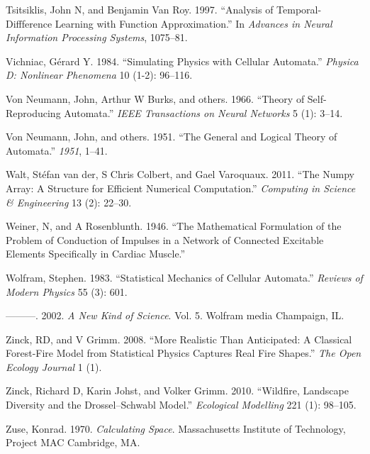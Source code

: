 \documentclass[
  openany]{book}
\newlength{\cslhangindent}
\newenvironment{cslreferences}%
  {\setlength{\parindent}{0pt}%
  \everypar{\setlength{\hangindent}{\cslhangindent}}\ignorespaces}%
  {\par}
\begin{document}
\begin{cslreferences}
\leavevmode\hypertarget{ref-tsitsiklis1997analysis}{}%
Tsitsiklis, John N, and Benjamin Van Roy. 1997. ``Analysis of Temporal-Diffference Learning with Function Approximation.'' In \emph{Advances in Neural Information Processing Systems}, 1075--81.

\leavevmode\hypertarget{ref-vichniac1984simulating}{}%
Vichniac, Gérard Y. 1984. ``Simulating Physics with Cellular Automata.'' \emph{Physica D: Nonlinear Phenomena} 10 (1-2): 96--116.

\leavevmode\hypertarget{ref-von1966theory}{}%
Von Neumann, John, Arthur W Burks, and others. 1966. ``Theory of Self-Reproducing Automata.'' \emph{IEEE Transactions on Neural Networks} 5 (1): 3--14.

\leavevmode\hypertarget{ref-von1951general}{}%
Von Neumann, John, and others. 1951. ``The General and Logical Theory of Automata.'' \emph{1951}, 1--41.

\leavevmode\hypertarget{ref-walt2011numpy}{}%
Walt, Stéfan van der, S Chris Colbert, and Gael Varoquaux. 2011. ``The Numpy Array: A Structure for Efficient Numerical Computation.'' \emph{Computing in Science \& Engineering} 13 (2): 22--30.

\leavevmode\hypertarget{ref-weiner1946mathematical}{}%
Weiner, N, and A Rosenblunth. 1946. ``The Mathematical Formulation of the Problem of Conduction of Impulses in a Network of Connected Excitable Elements Specifically in Cardiac Muscle.''

\leavevmode\hypertarget{ref-wolfram1983statistical}{}%
Wolfram, Stephen. 1983. ``Statistical Mechanics of Cellular Automata.'' \emph{Reviews of Modern Physics} 55 (3): 601.

\leavevmode\hypertarget{ref-wolfram2002new}{}%
---------. 2002. \emph{A New Kind of Science}. Vol. 5. Wolfram media Champaign, IL.

\leavevmode\hypertarget{ref-zinck2008more}{}%
Zinck, RD, and V Grimm. 2008. ``More Realistic Than Anticipated: A Classical Forest-Fire Model from Statistical Physics Captures Real Fire Shapes.'' \emph{The Open Ecology Journal} 1 (1).

\leavevmode\hypertarget{ref-zinck2010wildfire}{}%
Zinck, Richard D, Karin Johst, and Volker Grimm. 2010. ``Wildfire, Landscape Diversity and the Drossel--Schwabl Model.'' \emph{Ecological Modelling} 221 (1): 98--105.

\leavevmode\hypertarget{ref-zuse1970calculating}{}%
Zuse, Konrad. 1970. \emph{Calculating Space}. Massachusetts Institute of Technology, Project MAC Cambridge, MA.
\end{cslreferences}
\end{document}
